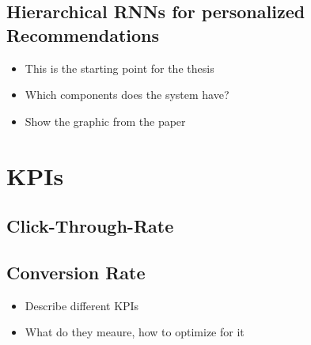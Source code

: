 \subsection{Hierarchical RNNs for personalized Recommendations}
\begin{itemize}
    \item This is the starting point for the thesis
    \item Which components does the system have?
    \item Show the graphic from the paper
\end{itemize}
\cite{hierarchical}

\section{KPIs}
\subsection{Click-Through-Rate}
\subsection{Conversion Rate}\label{conversion_rate}
\begin{itemize}
\item Describe different KPIs
\item What do they meaure, how to optimize for it
\end{itemize}